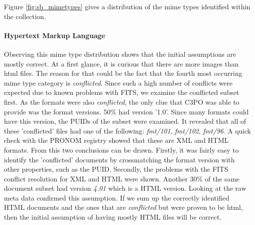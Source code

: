 Figure \ref{fig:sb_mimetypes} gives a distribution of the mime types identified within the collection.


\paragraph{Hypertext Markup Language}
Observing this mime type distribution shows that the initial assumptions are mostly correct. At a first glance, it is curious that there are more images than html files. The reason for that could be the fact that the fourth most occurring mime type category is \textit{conflicted}. Since such a high number of conflicts were expected due to known problems with FITS, we examine the conflicted subset first. As the formats were also \textit{conflicted}, the only clue that C3PO was able to provide was the format versions. 50\% had version '1.0'. Since many formats could have this version, the PUIDs of the subset were examined. It revealed that all of these 'conflicted' files had one of the following: \textit{fmt/101}, \textit{fmt/102}, \textit{fmt/96}. A quick check with the PRONOM registry showed that these are XML and HTML formats. From this two conclusions can be drawn. Firstly, it was fairly easy to identify the 'conflicted' documents by crossmatching the format version with other properties, such as the PUID. Secondly, the problems with the FITS conflict resolution for XML and HTML were shown. Another 30\% of the same document subset had version \textit{4.01} which is a HTML version. Looking at the raw meta data confirmed this assumption. If we sum up the correctly identified HTML documents and the ones that are \textit{conflicted} but were proven to be html, then the initial assumption of having mostly HTML files will be correct.

